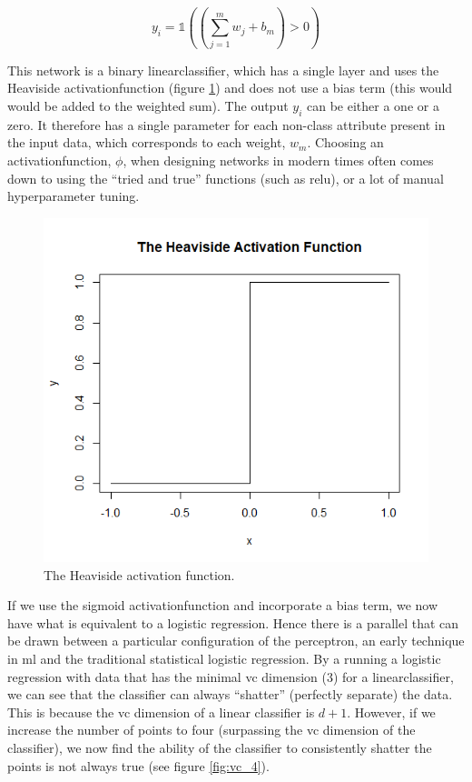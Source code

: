 \begin{equation}
    y_i = \mathds{1} ((\sum_{j = 1}^m w_j + b_m) > 0)
    \label{eq:nn_simple_pred}
\end{equation}

This network is a binary \gls{linearclassifier}, which has a single \gls{layer} and uses the Heaviside \gls{activationfunction} (figure \ref{fig:heavi_function}) and does not use a bias term (this would would be added to the weighted sum). The output $y_i$ can be either a one or a zero. It therefore has a single parameter for each non-class attribute present in the input data, which corresponds to each weight, $w_m$. Choosing an \gls{activationfunction}, $\phi$, when designing networks in modern times often comes down to using the \enquote{tried and true} functions (such as \gls{relu}), or a lot of manual \gls{hyperparameter} tuning.
\bigskip

\begin{figure}
    \includegraphics[scale=0.5]{figs/heavi.png}
    \caption{The Heaviside activation function.}
    \label{fig:heavi_function}
\end{figure}

If we use the sigmoid \gls{activationfunction} and incorporate a bias term, we now have what is equivalent to a logistic regression. Hence there is a parallel that can be drawn between a particular configuration of the perceptron, an early technique in \gls{ml} and the traditional statistical logistic regression. By a running a logistic regression with data that has the minimal \gls{vc} dimension (3) for a \gls{linearclassifier}, we can see that the classifier can always \enquote{shatter} (perfectly separate) the data. This is because the \gls{vc} dimension of a linear classifier is $d+1$. However, if we increase the number of points to four (surpassing the \gls{vc} dimension of the classifier), we now find the ability of the classifier to consistently shatter the points is not always true (see figure \ref{fig:vc_4}).

